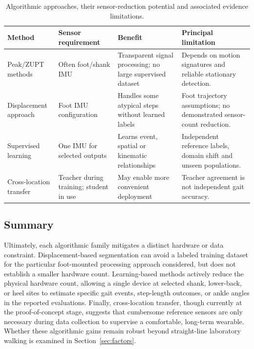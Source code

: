 \documentclass[10pt,a4paper,twocolumn]{article}
\begin{document}
\begin{table}[!t]
 \centering\footnotesize
 \caption{Algorithmic approaches, their sensor-reduction potential and associated evidence limitations.}
 \label{tab:algorithms}
 \begin{tabularx}{\linewidth}{@{}p{2cm}p{1.75cm}YY@{}}
 \toprule
 Method & Sensor requirement & Benefit & Principal limitation \\
 \midrule
 Peak/ZUPT methods \citep{wagstaff2020,romijnders2021} & Often foot/shank IMU & Transparent signal processing; no large supervised dataset & Depends on motion signatures and reliable stationary detection. \\
 Displacement approach \citep{ruizruiz2024} & Foot IMU configuration & Handles some atypical steps without learned labels & Foot trajectory assumptions; no demonstrated sensor-count reduction. \\
 Supervised learning \citep{romijnders2022,zadka2024,wang2025l} & One IMU for selected outputs & Learns event, spatial or kinematic relationships & Independent reference labels, domain shift and unseen populations. \\
 Cross-location transfer \citep{koroglu2018,kolakowski2024} & Teacher during training; student in use & May enable more convenient deployment & Teacher agreement is not independent gait accuracy. \\
 \bottomrule
 \end{tabularx}
\end{table}

\subsection{Summary}

Ultimately, each algorithmic family mitigates a distinct hardware or data constraint. Displacement-based segmentation can avoid a labeled training dataset for the particular foot-mounted processing approach considered, but does not establish a smaller hardware count. Learning-based methods actively reduce the physical hardware count, allowing a single device at selected shank, lower-back, or heel sites to estimate specific gait events, step-length outcomes, or ankle angles in the reported evaluations. Finally, cross-location transfer, though currently at the proof-of-concept stage, suggests that cumbersome reference sensors are only necessary during data collection to supervise a comfortable, long-term wearable. Whether these algorithmic gains remain robust beyond straight-line laboratory walking is examined in Section~\ref{sec:factors}.
\end{document}
